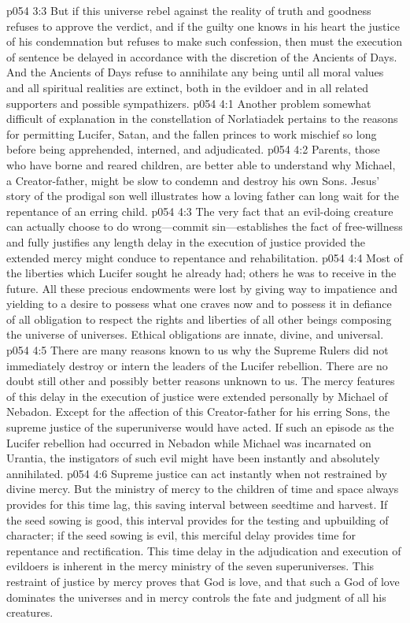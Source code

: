 \vs p054 3:3 But if this universe rebel against the reality of truth and goodness refuses to approve the verdict, and if the guilty one knows in his heart the justice of his condemnation but refuses to make such confession, then must the execution of sentence be delayed in accordance with the discretion of the Ancients of Days. And the Ancients of Days refuse to annihilate any being until all moral values and all spiritual realities are extinct, both in the evildoer and in all related supporters and possible sympathizers.
\vs p054 4:1 Another problem somewhat difficult of explanation in the constellation of Norlatiadek pertains to the reasons for permitting Lucifer, Satan, and the fallen princes to work mischief so long before being apprehended, interned, and adjudicated.
\vs p054 4:2 Parents, those who have borne and reared children, are better able to understand why Michael, a Creator\hyp{}father, might be slow to condemn and destroy his own Sons. Jesus’ story of the prodigal son well illustrates how a loving father can long wait for the repentance of an erring child.
\vs p054 4:3 The very fact that an evil\hyp{}doing creature can actually choose to do wrong---commit sin---establishes the fact of free\hyp{}willness and fully justifies any length delay in the execution of justice provided the extended mercy might conduce to repentance and rehabilitation.
\pc \vs p054 4:4 Most of the liberties which Lucifer sought he already had; others he was to receive in the future. All these precious endowments were lost by giving way to impatience and yielding to a desire to possess what one craves now and to possess it in defiance of all obligation to respect the rights and liberties of all other beings composing the universe of universes. Ethical obligations are innate, divine, and universal.
\pc \vs p054 4:5 There are many reasons known to us why the Supreme Rulers did not immediately destroy or intern the leaders of the Lucifer rebellion. There are no doubt still other and possibly better reasons unknown to us. The mercy features of this delay in the execution of justice were extended personally by Michael of Nebadon. Except for the affection of this Creator\hyp{}father for his erring Sons, the supreme justice of the superuniverse would have acted. If such an episode as the Lucifer rebellion had occurred in Nebadon while Michael was incarnated on Urantia, the instigators of such evil might have been instantly and absolutely annihilated.
\vs p054 4:6 Supreme justice can act instantly when not restrained by divine mercy. But the ministry of mercy to the children of time and space always provides for this time lag, this saving interval between seedtime and harvest. If the seed sowing is good, this interval provides for the testing and upbuilding of character; if the seed sowing is evil, this merciful delay provides time for repentance and rectification. This time delay in the adjudication and execution of evildoers is inherent in the mercy ministry of the seven superuniverses. This restraint of justice by mercy proves that God is love, and that such a God of love dominates the universes and in mercy controls the fate and judgment of all his creatures.
